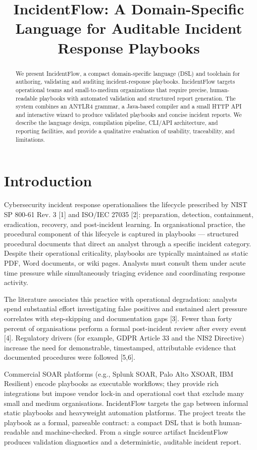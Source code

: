\documentclass[conference]{IEEEtran}
\title{IncidentFlow: A Domain-Specific Language for Auditable Incident Response Playbooks}
\author{\IEEEauthorblockN{ }
\vspace{-6mm}}
\begin{document}
\maketitle

\begin{abstract}
We present IncidentFlow, a compact domain-specific language (DSL) and toolchain for authoring, validating and auditing incident-response playbooks. IncidentFlow targets operational teams and small-to-medium organizations that require precise, human-readable playbooks with automated validation and structured report generation. The system combines an ANTLR4 grammar, a Java-based compiler and a small HTTP API and interactive wizard to produce validated playbooks and concise incident reports. We describe the language design, compilation pipeline, CLI/API architecture, and reporting facilities, and provide a qualitative evaluation of usability, traceability, and limitations.
\end{abstract}

\section{Introduction}
Cybersecurity incident response operationalises the lifecycle prescribed by NIST SP 800-61 Rev. 3 [1] and ISO/IEC 27035 [2]: preparation, detection, containment, eradication, recovery, and post-incident learning. In organisational practice, the procedural component of this lifecycle is captured in playbooks — structured procedural documents that direct an analyst through a specific incident category. Despite their operational criticality, playbooks are typically maintained as static PDF, Word documents, or wiki pages. Analysts must consult them under acute time pressure while simultaneously triaging evidence and coordinating response activity.

The literature associates this practice with operational degradation: analysts spend substantial effort investigating false positives and sustained alert pressure correlates with step-skipping and documentation gaps [3]. Fewer than forty percent of organisations perform a formal post-incident review after every event [4]. Regulatory drivers (for example, GDPR Article 33 and the NIS2 Directive) increase the need for demonstrable, timestamped, attributable evidence that documented procedures were followed [5,6].

Commercial SOAR platforms (e.g., Splunk SOAR, Palo Alto XSOAR, IBM Resilient) encode playbooks as executable workflows; they provide rich integrations but impose vendor lock-in and operational cost that exclude many small and medium organisations. IncidentFlow targets the gap between informal static playbooks and heavyweight automation platforms. The project treats the playbook as a formal, parseable contract: a compact DSL that is both human-readable and machine-checked. From a single source artifact IncidentFlow produces validation diagnostics and a deterministic, auditable incident report.
\end{document}
